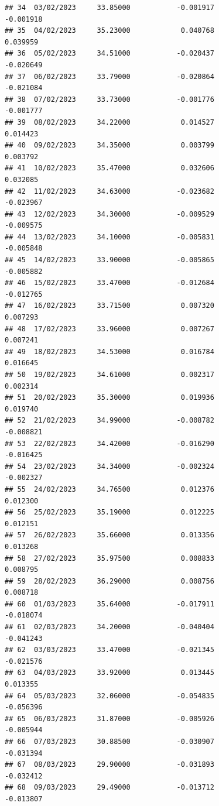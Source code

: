 \documentclass[
]{article}
\begin{document}
\begin{verbatim}
## 34  03/02/2023     33.85000           -0.001917               -0.001918
## 35  04/02/2023     35.23000            0.040768                0.039959
## 36  05/02/2023     34.51000           -0.020437               -0.020649
## 37  06/02/2023     33.79000           -0.020864               -0.021084
## 38  07/02/2023     33.73000           -0.001776               -0.001777
## 39  08/02/2023     34.22000            0.014527                0.014423
## 40  09/02/2023     34.35000            0.003799                0.003792
## 41  10/02/2023     35.47000            0.032606                0.032085
## 42  11/02/2023     34.63000           -0.023682               -0.023967
## 43  12/02/2023     34.30000           -0.009529               -0.009575
## 44  13/02/2023     34.10000           -0.005831               -0.005848
## 45  14/02/2023     33.90000           -0.005865               -0.005882
## 46  15/02/2023     33.47000           -0.012684               -0.012765
## 47  16/02/2023     33.71500            0.007320                0.007293
## 48  17/02/2023     33.96000            0.007267                0.007241
## 49  18/02/2023     34.53000            0.016784                0.016645
## 50  19/02/2023     34.61000            0.002317                0.002314
## 51  20/02/2023     35.30000            0.019936                0.019740
## 52  21/02/2023     34.99000           -0.008782               -0.008821
## 53  22/02/2023     34.42000           -0.016290               -0.016425
## 54  23/02/2023     34.34000           -0.002324               -0.002327
## 55  24/02/2023     34.76500            0.012376                0.012300
## 56  25/02/2023     35.19000            0.012225                0.012151
## 57  26/02/2023     35.66000            0.013356                0.013268
## 58  27/02/2023     35.97500            0.008833                0.008795
## 59  28/02/2023     36.29000            0.008756                0.008718
## 60  01/03/2023     35.64000           -0.017911               -0.018074
## 61  02/03/2023     34.20000           -0.040404               -0.041243
## 62  03/03/2023     33.47000           -0.021345               -0.021576
## 63  04/03/2023     33.92000            0.013445                0.013355
## 64  05/03/2023     32.06000           -0.054835               -0.056396
## 65  06/03/2023     31.87000           -0.005926               -0.005944
## 66  07/03/2023     30.88500           -0.030907               -0.031394
## 67  08/03/2023     29.90000           -0.031893               -0.032412
## 68  09/03/2023     29.49000           -0.013712               -0.013807

\end{verbatim}
\end{document}
